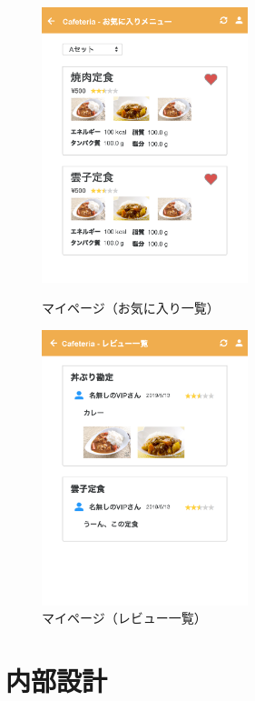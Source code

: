 \documentclass[a4paper]{ltjsarticle}
\begin{document}
    \begin{figure}[ht]
        \begin{minipage}[t]{.49\textwidth}
            \center
            \includegraphics[width=60mm]{ui/liked-list.png}
            \caption{マイページ（お気に入り一覧）}
            \label{img:liked-list}
        \end{minipage}
        \begin{minipage}[t]{.49\textwidth}
            \center
            \includegraphics[width=60mm]{ui/review-list.png}
            \caption{マイページ（レビュー一覧）}
            \label{img:review-list}
        \end{minipage}
    \end{figure}


\clearpage

\section{内部設計}
\end{document}
